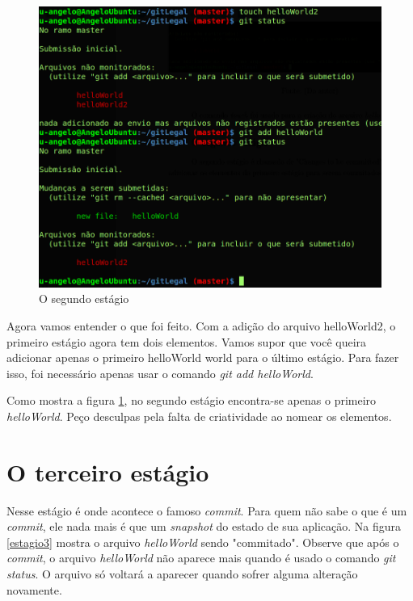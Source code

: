 \documentclass[12pt,openright,oneside,a4paper,english,brazil]{abntex2}
\begin{document}
\begin{figure}[h]
	\caption{\label{estagio2}O segundo estágio}
	\begin{center}
		\includegraphics[width=1\linewidth]{estagio2}
	\end{center}
\end{figure}

Agora vamos entender o que foi feito. Com a adição do arquivo helloWorld2, o primeiro estágio agora tem dois elementos. Vamos supor que você queira adicionar apenas o primeiro helloWorld world para o último estágio. Para fazer isso, foi necessário apenas usar o comando \textit{git add helloWorld}.

Como mostra a figura \ref{estagio2}, no segundo estágio encontra-se apenas o primeiro \textit{helloWorld}. Peço desculpas pela falta de criatividade ao nomear os elementos.

\section{O terceiro estágio}

Nesse estágio é onde acontece o famoso \textit{commit}. Para quem não sabe o que é um \textit{commit}, ele nada mais é que um \textit{snapshot} do estado de sua aplicação. Na figura \ref{estagio3} mostra o arquivo \textit{helloWorld} sendo "commitado". Observe que após o \textit{commit}, o arquivo \textit{helloWorld} não aparece mais quando é usado o comando \textit{git status}. O arquivo só voltará a aparecer quando sofrer alguma alteração novamente. 
\end{document}
